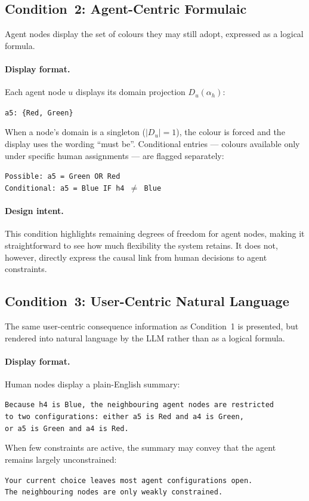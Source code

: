 \documentclass[10pt]{article}
\theoremstyle{definition}
\begin{document}
\subsection{Condition~2: Agent-Centric Formulaic}
\label{sec:c2}

Agent nodes display the set of colours they may still adopt, expressed as a logical formula.

\paragraph{Display format.}
Each agent node $u$ displays its domain projection $D_u(\alpha_h)$:
\begin{center}
\small
\texttt{a5: \{Red, Green\}}
\end{center}
When a node's domain is a singleton ($|D_u| = 1$), the colour is forced and the display uses
the wording ``must be''.  Conditional entries --- colours available only under specific human
assignments --- are flagged separately:
\begin{center}
\small
\texttt{Possible: a5 = Green OR Red}\\
\texttt{Conditional: a5 = Blue IF h4 $\neq$ Blue}
\end{center}

\paragraph{Design intent.}
This condition highlights remaining degrees of freedom for agent nodes, making it straightforward
to see how much flexibility the system retains.  It does not, however, directly express the
causal link from human decisions to agent constraints.

\subsection{Condition~3: User-Centric Natural Language}
\label{sec:c3}

The same user-centric consequence information as Condition~1 is presented, but rendered into
natural language by the LLM rather than as a logical formula.

\paragraph{Display format.}
Human nodes display a plain-English summary:
\begin{center}
\small
\texttt{Because h4 is Blue, the neighbouring agent nodes are restricted}\\
\texttt{to two configurations: either a5 is Red and a4 is Green,}\\
\texttt{or a5 is Green and a4 is Red.}
\end{center}
When few constraints are active, the summary may convey that the agent remains largely
unconstrained:
\begin{center}
\small
\texttt{Your current choice leaves most agent configurations open.}\\
\texttt{The neighbouring nodes are only weakly constrained.}
\end{center}
\end{document}
